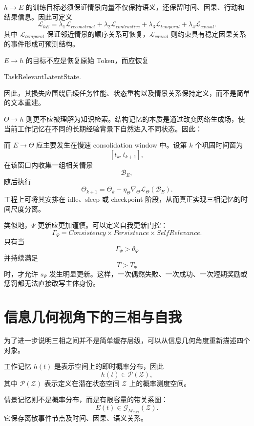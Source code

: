 $h\rightarrow E$ 的训练目标必须保证情景向量不仅保持语义，还保留时间、因果、行动和结果信息。因此可定义
\[
\mathcal{L}_{hE}
=
\lambda_1\mathcal{L}_{reconstruct}
+
\lambda_2\mathcal{L}_{contrastive}
+
\lambda_3\mathcal{L}_{temporal}
+
\lambda_4\mathcal{L}_{causal}.
\]
其中 $\mathcal{L}_{temporal}$ 保证邻近情景的顺序关系可恢复，$\mathcal{L}_{causal}$ 则约束具有稳定因果关系的事件形成可预测结构。

$E\rightarrow h$ 的目标不应是恢复原始 Token，而应恢复
\begin{statementbox}
TaskRelevantLatentState.
\end{statementbox}
因此，其损失应围绕后续任务性能、状态重构以及情景关系保持定义，而不是简单的文本重建。

$\Theta\rightarrow h$ 则更不应被理解为知识检索。结构记忆的本质是通过改变网络生成场，使当前工作记忆在不同的长期经验背景下自然进入不同状态。因此：
\begin{statementbox}
\centering
{}
\end{statementbox}

而 $E\rightarrow\Theta$ 应主要发生在慢速 consolidation window 中。设第 $k$ 个巩固时间窗为
\[
[t_k,t_{k+1}],
\]
在该窗口内收集一组相关情景
\[
\mathcal{B}_E,
\]
随后执行
\[
\Theta_{k+1}
=
\Theta_k
-
\eta_\Theta
\nabla_\Theta
\mathcal{L}_\Theta
\left(
\mathcal{B}_E
\right).
\]
工程上可将其安排在 idle、sleep 或 checkpoint 阶段，从而真正实现三相记忆的时间尺度分离。

类似地，$\Psi$ 更新应更加谨慎。可以定义自我更新门控：
\[
\Gamma_\Psi
=
Consistency
\times
Persistence
\times
SelfRelevance.
\]
只有当
\[
\Gamma_\Psi
>
\theta_\Psi
\]
并持续满足
\[
T
>
T_\Psi
\]
时，才允许 $s_\Psi$ 发生明显更新。这样，一次偶然失败、一次成功、一次短期奖励或惩罚都无法直接改写主体身份。

\section{信息几何视角下的三相与自我}

为了进一步说明三相之间并不是简单缓存层级，可以从信息几何角度重新描述四个对象。

工作记忆 $h(t)$ 是表示空间上的即时概率分布，因此
\[
h(t)
\in
\mathcal{P}(\mathcal{Z}),
\]
其中 $\mathcal{P}(\mathcal{Z})$ 表示定义在潜在状态空间 $\mathcal{Z}$ 上的概率测度空间。

情景记忆则不是概率分布，而是有限容量的带关系图：
\[
E(t)
\in
\mathcal{G}_{M_{\max}}(\mathcal{Z}).
\]
它保存离散事件节点及时间、因果、语义关系。

